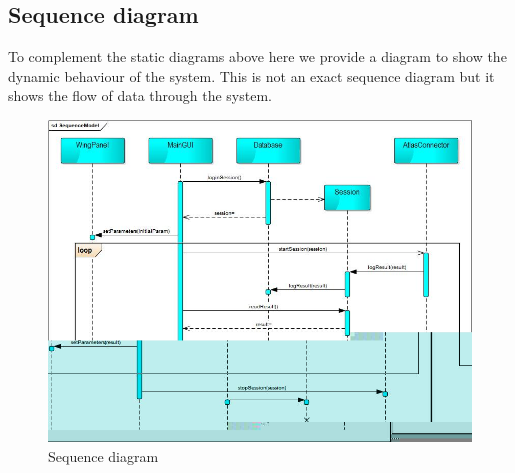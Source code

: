 \documentclass[10pt,a4paper]{report}
\begin{document}
\subsection{Sequence diagram}
To complement the static diagrams above here we provide a diagram to show the dynamic behaviour of the system. This is not an exact sequence diagram but it shows the flow of data through the system.
\begin{figure}[h!]
\includegraphics[width=\textwidth]{SequenceModel.jpg}
\caption{Sequence diagram}
\end{figure}
\end{document}
